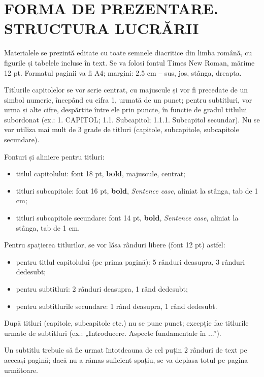 
\chapter{FORMA DE PREZENTARE.\\ STRUCTURA LUCRĂRII}

Materialele se prezintă editate cu toate semnele diacritice din limba română, cu figurile și tabelele incluse în text. Se va folosi fontul Times New Roman, mărime 12 pt. Formatul paginii va fi A4; margini: 2.5 cm – sus, jos, stânga, dreapta.

Titlurile capitolelor se vor scrie centrat, cu majuscule și vor fi precedate de un simbol numeric, începând cu cifra 1, urmată de un punct; pentru subtitluri, vor urma și alte cifre, despărțite între ele prin puncte, în funcție de gradul titlului subordonat (ex.: 1. CAPITOL; 1.1. Subcapitol; 1.1.1. Subcapitol secundar). Nu se vor utiliza mai mult de 3 grade de titluri (capitole, subcapitole, subcapitole secundare).

Fonturi și aliniere pentru titluri:
\begin{itemize}
	\item titlul capitolului: font 18 pt, \textbf{bold}, majuscule, centrat;
	\item titluri subcapitole: font 16 pt, \textbf{bold}, \textit{Sentence case}, aliniat la stânga, tab de 1 cm;
	\item titluri subcapitole secundare: font 14 pt, \textbf{bold}, \textit{Sentence case}, aliniat la stânga, tab de 1 cm.
\end{itemize}

 Pentru spațierea titlurilor, se vor lăsa rânduri libere (font 12 pt) astfel:
 \begin{itemize}
	\item pentru titlul capitolului (pe prima pagină): 5 rânduri deasupra, 3 rânduri dedesubt;
	\item pentru subtitluri: 2 rânduri deasupra, 1 rând dedesubt;
	\item pentru subtitlurile secundare: 1 rând deasupra, 1 rând dedesubt.
\end{itemize}

După titluri (capitole, subcapitole etc.) nu se pune punct; excepție fac titlurile urmate de subtitluri (ex.: „Introducere. Aspecte fundamentale în ...”).

Un subtitlu trebuie să fie urmat întotdeauna de cel puțin 2 rânduri de text pe aceeași pagină; dacă nu a rămas suficient spațiu, se va deplasa totul pe pagina următoare. \\


